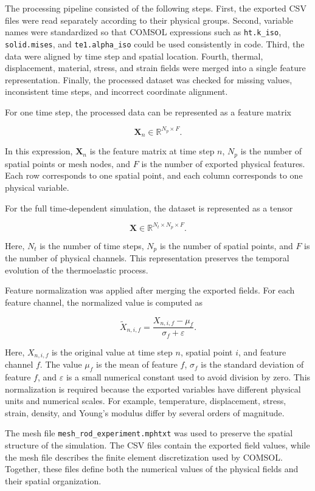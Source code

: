 The processing pipeline consisted of the following steps. First, the exported CSV files were read separately according to their physical groups. Second, variable names were standardized so that COMSOL expressions such as \texttt{ht.k\_iso}, \texttt{solid.mises}, and \texttt{te1.alpha\_iso} could be used consistently in code. Third, the data were aligned by time step and spatial location. Fourth, thermal, displacement, material, stress, and strain fields were merged into a single feature representation. Finally, the processed dataset was checked for missing values, inconsistent time steps, and incorrect coordinate alignment.

For one time step, the processed data can be represented as a feature matrix

\[
\mathbf{X}_n \in \mathbb{R}^{N_p \times F}.
\]

In this expression, \(\mathbf{X}_n\) is the feature matrix at time step \(n\), \(N_p\) is the number of spatial points or mesh nodes, and \(F\) is the number of exported physical features. Each row corresponds to one spatial point, and each column corresponds to one physical variable.

For the full time-dependent simulation, the dataset is represented as a tensor

\[
\mathbf{X} \in \mathbb{R}^{N_t \times N_p \times F}.
\]

Here, \(N_t\) is the number of time steps, \(N_p\) is the number of spatial points, and \(F\) is the number of physical channels. This representation preserves the temporal evolution of the thermoelastic process.

Feature normalization was applied after merging the exported fields. For each feature channel, the normalized value is computed as

\[
\widetilde{X}_{n,i,f}
=
\frac{
X_{n,i,f} - \mu_f
}{
\sigma_f + \varepsilon
}.
\]

Here, \(X_{n,i,f}\) is the original value at time step \(n\), spatial point \(i\), and feature channel \(f\). The value \(\mu_f\) is the mean of feature \(f\), \(\sigma_f\) is the standard deviation of feature \(f\), and \(\varepsilon\) is a small numerical constant used to avoid division by zero. This normalization is required because the exported variables have different physical units and numerical scales. For example, temperature, displacement, stress, strain, density, and Young's modulus differ by several orders of magnitude.

The mesh file \texttt{mesh\_rod\_experiment.mphtxt} was used to preserve the spatial structure of the simulation. The CSV files contain the exported field values, while the mesh file describes the finite element discretization used by COMSOL. Together, these files define both the numerical values of the physical fields and their spatial organization.

